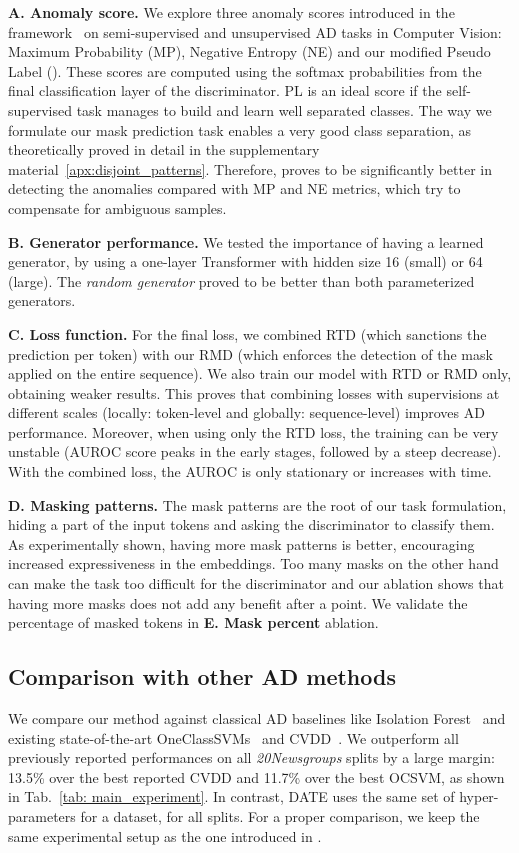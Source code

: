 \documentclass[11pt]{article}
\begin{document}
\noindent\textbf{A. Anomaly score.} We explore three anomaly scores introduced in the \emph{} framework~\cite{neurips2019} on semi-supervised and unsupervised AD tasks in Computer Vision: Maximum Probability (MP), Negative Entropy (NE) and our modified Pseudo Label (). These scores are computed using the softmax probabilities from the final classification layer of the discriminator. PL is an ideal score if the self-supervised task manages to build and learn well separated classes. The way we formulate our mask prediction task enables a very good class separation, as theoretically proved in detail in the supplementary material~\ref{apx:disjoint_patterns}. Therefore,  proves to be significantly better in detecting the anomalies compared with MP and NE metrics, which try to compensate for ambiguous samples.


\noindent\textbf{B. Generator performance.} We tested the importance of having a learned generator, by using a one-layer Transformer with hidden size 16 (small) or 64 (large). The \emph{random generator} proved to be better than both parameterized generators.

\noindent\textbf{C. Loss function.} For the final loss, we combined RTD (which sanctions the prediction per token) with our RMD (which enforces the detection of the mask applied on the entire sequence). We also train our model with RTD or RMD only, obtaining weaker results. This proves that combining losses with supervisions at different scales (locally: token-level and globally: sequence-level) improves AD performance. Moreover, when using only the RTD loss, the training can be very unstable (AUROC score peaks in the early stages, followed by a steep decrease). With the combined loss, the AUROC is only stationary or increases with time.


\noindent\textbf{D. Masking patterns.} The mask patterns are the root of our task formulation, hiding a part of the input tokens and asking the discriminator to classify them. As experimentally shown, having more mask patterns is better, encouraging increased expressiveness in the embeddings. Too many masks on the other hand can make the task too difficult for the discriminator and our ablation shows that having more masks does not add any benefit after a point. We validate the percentage of masked tokens in \textbf{E. Mask percent} ablation.

\subsection{Comparison with other AD methods}
\label{sec: ex-ssad}
We compare our method against classical AD baselines like Isolation Forest~\cite{iso_forest} and existing state-of-the-art OneClassSVMs~\cite{ocsmv} and CVDD~\cite{acl2019}. We outperform all previously reported performances on all \emph{20Newsgroups} splits by a large margin: 13.5\% over the best reported CVDD and 11.7\% over the best OCSVM, as shown in Tab.~\ref{tab: main_experiment}. In contrast, DATE uses the same set of hyper-parameters for a dataset, for all splits. For a proper comparison, we keep the same experimental setup as the one introduced in \cite{acl2019}.
\end{document}
